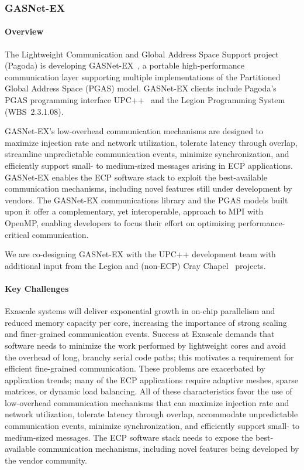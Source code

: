 \subsubsection{ GASNet-EX}
\paragraph{Overview} 

The Lightweight Communication and Global Address Space Support project (Pagoda)
is developing GASNet-EX~\cite{gasnet-site}, a portable high-performance communication layer
supporting multiple implementations of the Partitioned Global Address Space
(PGAS) model.
GASNet-EX clients include Pagoda's PGAS programming interface UPC++~\cite{Bachan:paw17,upcxx-site}
 and the Legion Programming
System~\cite{bauer2012legion,legion-site} (WBS~2.3.1.08).

GASNet-EX's low-overhead communication mechanisms are designed to maximize
injection rate and network utilization, tolerate latency through
overlap, streamline unpredictable communication events, minimize
synchronization, and efficiently support small- to medium-sized
messages arising in ECP applications.  GASNet-EX enables the ECP
software stack to exploit the best-available communication mechanisms,
including novel features still under development by vendors.  The
GASNet-EX communications library and the PGAS models built upon it
offer a complementary, yet interoperable, approach to MPI with OpenMP,
enabling developers to focus their effort on optimizing
performance-critical communication.

We are co-designing GASNet-EX with the UPC++ development team with
additional input from the Legion and
(non-ECP) Cray Chapel~\cite{chapel-chapter,chapel-site} projects.

\paragraph{Key  Challenges}

Exascale systems will deliver exponential growth in on-chip parallelism and
reduced memory capacity per core, 
increasing the importance of strong
scaling and finer-grained communication events.  
Success at Exascale demands that
software needs to minimize the work performed by lightweight cores and avoid the
overhead of long, branchy serial code paths; 
this motivates a requirement for efficient
fine-grained communication.
These problems are exacerbated by application trends; many of the ECP applications require
adaptive meshes, sparse matrices,
or dynamic load balancing.
All of these characteristics favor the use of
low-overhead communication mechanisms that
can maximize injection rate and network utilization, tolerate latency through
overlap, accommodate unpredictable communication events, minimize synchronization,
and efficiently support small- to medium-sized messages. The ECP software stack
needs to expose the best-available communication mechanisms, including novel
features being developed by the vendor community.

